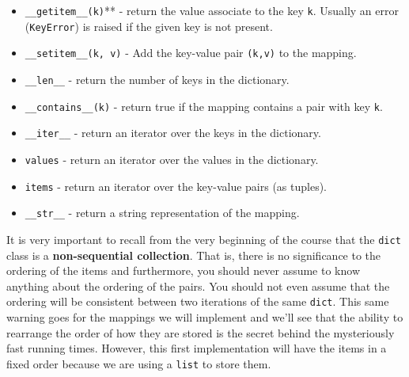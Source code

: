 \begin{itemize}

\item 

\texttt{\_\_getitem\_\_(k)}** - return the value associate to the key \texttt{k}.  Usually an error (\texttt{KeyError}) is raised if the given key is not present.



\item 

\texttt{\_\_setitem\_\_(k, v)} - Add the key-value pair \texttt{(k,v)} to the mapping.



\item 

\texttt{\_\_len\_\_} - return the number of keys in the dictionary.



\item 

\texttt{\_\_contains\_\_(k)} - return true if the mapping contains a pair with key \texttt{k}.



\item 

\texttt{\_\_iter\_\_} - return an iterator over the keys in the dictionary.



\item 

\texttt{values} - return an iterator over the values in the dictionary.



\item 

\texttt{items} - return an iterator over the key-value pairs (as tuples).



\item 

\texttt{\_\_str\_\_} - return a string representation of the mapping.



\end{itemize}

It is very important to recall from the very beginning of the course that the \texttt{dict} class is a \textbf{non-sequential collection}.  That is, there is no significance to the ordering of the items and furthermore, you should never assume to know anything about the ordering of the pairs.  You should not even assume that the ordering will be consistent between two iterations of the same \texttt{dict}.  This same warning goes for the mappings we will implement and we'll see that the ability to rearrange the order of how they are stored is the secret behind the mysteriously fast running times.  However, this first implementation will have the items in a fixed order because we are using a \texttt{list} to store them.

